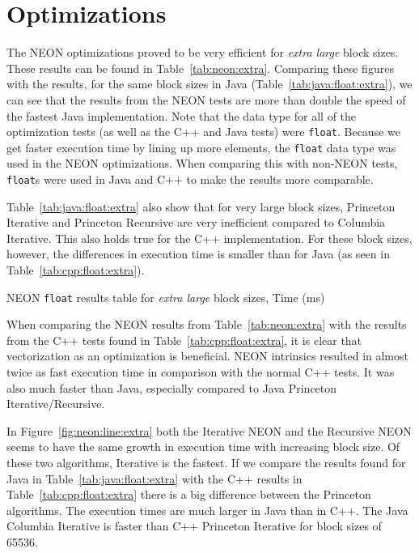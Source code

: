 \section{Optimizations}
The NEON optimizations proved to be very efficient for \emph{extra large} block sizes. These results can be found in Table~\ref{tab:neon:extra}. Comparing these figures with the results, for the same block sizes in Java (Table~\ref{tab:java:float:extra}), we can see that the results from the NEON tests are more than double the speed of the fastest Java implementation. Note that the data type for all of the optimization tests (as well as the C++ and Java tests) were \texttt{float}. Because we get faster execution time by lining up more elements, the \texttt{float} data type was used in the NEON optimizations. When comparing this with non-NEON tests, \texttt{float}s were used in Java and C++ to make the results more comparable.

Table~\ref{tab:java:float:extra} also show that for very large block sizes, Princeton Iterative and Princeton Recursive are very inefficient compared to Columbia Iterative. This also holds true for the C++ implementation. For these block sizes, however, the differences in execution time is smaller than for Java (as seen in Table~\ref{tab:cpp:float:extra}).

\ifrelease
\begin{table}
    \centering
    \caption{NEON \texttt{float} results table for \emph{extra large} block sizes, Time (ms)}
    \label{tab:neon:extra}
    
\end{table}
\fi

When comparing the NEON results from Table~\ref{tab:neon:extra} with the results from the C++ tests found in Table~\ref{tab:cpp:float:extra}, it is clear that vectorization as an optimization is beneficial. NEON intrinsics resulted in almost twice as fast execution time in comparison with the normal C++ tests. It was also much faster than Java, especially compared to Java Princeton Iterative/Recursive.

In Figure~\ref{fig:neon:line:extra} both the Iterative NEON and the Recursive NEON seems to have the same growth in execution time with increasing block size. Of these two algorithms, Iterative is the fastest. If we compare the results found for Java in Table~\ref{tab:java:float:extra} with the C++ results in Table~\ref{tab:cpp:float:extra} there is a big difference between the Princeton algorithms. The execution times are much larger in Java than in C++. The Java Columbia Iterative is faster than C++ Princeton Iterative for block sizes of 65536.

